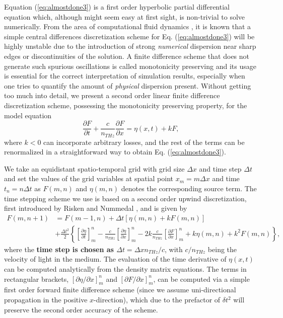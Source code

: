 \documentclass[preprint,secnumarabic,amssymb, nobibnotes, aip, prd]{revtex4-1}
\begin{document}
	Equation (\ref{eq:almostdone3}) is a first order hyperbolic partial differential equation which, although might seem easy at first sight, is non-trivial to solve numerically. From the area of computational fluid dynamics
	\cite{wesseling2009principles}, it is known that a simple central differences
	discretization scheme for Eq. (\ref{eq:almostdone3}) will be highly unstable due to
	the introduction of strong \emph{numerical} dispersion near sharp edges or
	discontinuities of the solution. A finite difference scheme that does not
	generate such spurious oscillations is called monotonicity preserving
	\cite{wesseling2009principles} and its usage is essential for the correct
	interpretation of simulation results, especially when one tries to quantify
	the amount of \emph{physical} dispersion present. Without getting too much
	into detail, we present a second order linear finite difference discretization
	scheme, possessing the monotonicity preserving property, for the model equation
	\begin{equation}
	\label{eq:model-equation}
	\frac{\partial F}{\partial t}+ \frac{c}{n_{THz}}\frac{\partial F}{\partial
		x}=\eta(x,t)+kF,%
	\end{equation}
	where $k<0$ can incorporate arbitrary losses, and the rest of the terms can be renormalized in a straightforward way to obtain Eq. (\ref{eq:almostdone3}).
	
	We take an equidistant spatio-temporal grid with grid size $\Delta x$ and time
	step $\Delta t$ and set the values of the grid variables at spatial point
	$x_{m}=m\Delta x$ and time $t_{n}=n\Delta t$ as $F(m,n)$ and $\eta(m,n)$ denotes the corresponding source term. The time stepping scheme we use is based on a second order upwind discretization, first introduced by Risken and Nummedal \cite{risken1968self}, and is given by
	\begin{align}
	\label{eq:numerics}
	F(m,n+1) &  =F(m-1,n)+\Delta t\left[ \eta(m,n)+kF(m,n)\right]  \nonumber\\
	&  +\frac{\Delta t^{2}}{2}\left\{  \left[  \frac{\partial \eta}{\partial
		t}\right]_{m}^{n}- \frac{c}{n_{THz}}\left[  \frac{\partial \eta}{\partial x}\right]
	_{m}^{n}-2k\frac{c}{n_{THz}}\left[  \frac{\partial F}{\partial x}\right]_{m}%
	^{n}+k\eta(m,n)+k^{2}F(m,n)\right\}  ,
	\end{align}
	where the \textbf{time step is chosen as $\Delta t=\Delta xn_{THz}/c$}, with $c/n_{THz}$
	being the velocity of light in the medium. The evaluation of the time
	derivative of $\eta(x,t)$ can be computed analytically from the density matrix
	equations. The terms in rectangular brackets, $\left[
	\partial \eta/\partial x\right]_{m}^{n}$ and $\left[  \partial F/\partial x\right]  _{m}^{n}$, can be computed via a simple first order forward
	finite difference scheme (since we assume uni-directional propagation in the positive $x$-direction), which due to the prefactor of $\delta t^2$ will preserve the second order accuracy of the scheme.  
	
\end{document}
